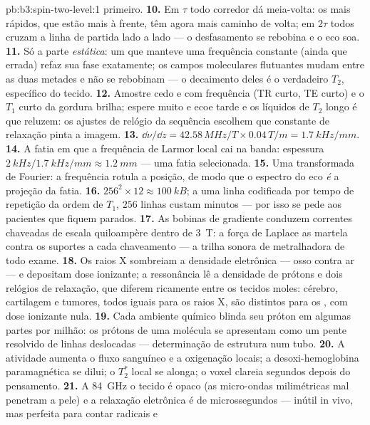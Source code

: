 \begin{solution}{pb:b3:spin-two-level:1}
primeiro.
\textbf{10.} Em $\tau$ todo corredor dá meia-volta: os mais rápidos,
que estão mais à frente, têm agora mais caminho de volta; em $2\tau$
todos cruzam a linha de partida lado a lado --- o desfasamento se
rebobina e o eco soa.
\textbf{11.} Só a parte \emph{estática}: um  que manteve uma
frequência constante (ainda que errada) refaz sua fase exatamente; os
campos moleculares flutuantes mudam entre as duas metades e não se
rebobinam --- o decaimento deles é o verdadeiro $T_2$, específico do
tecido.
\textbf{12.} Amostre cedo e com frequência (TR curto, TE curto) e o
$T_1$ curto da gordura brilha; espere muito e ecoe tarde e os líquidos
de $T_2$ longo é que reluzem: os ajustes de relógio da sequência
escolhem que constante de relaxação pinta a imagem.
\textbf{13.} $\dd\nu/\dd z = 42.58\,\unit{MHz/T} \times
0.04\,\unit{T/m} = \qty{1.7}{kHz/mm}$.
\textbf{14.} A fatia em que a frequência de Larmor local cai na banda:
espessura $\qty{2}{kHz}/\qty{1.7}{kHz/mm} \approx
\qty{1.2}{mm}$ --- uma fatia selecionada.
\textbf{15.} Uma transformada de Fourier: a frequência rotula a
posição, de modo que o espectro do eco \emph{é} a projeção da fatia.
\textbf{16.} $256^2 \times 12 \approx \qty{100}{kB}$; a uma linha
codificada por tempo de repetição da ordem de $T_1$, $256$ linhas
custam minutos --- por isso se pede aos pacientes que fiquem parados.
\textbf{17.} As bobinas de gradiente conduzem correntes chaveadas de
escala quiloampère dentro de \qty{3}{T}: a força de Laplace as martela
contra os suportes a cada chaveamento --- a trilha sonora de
metralhadora de todo exame.
\textbf{18.} Os raios X sombreiam a densidade eletrônica --- osso
contra ar --- e depositam dose ionizante; a ressonância lê a densidade
de prótons e dois relógios de relaxação, que diferem ricamente entre os
tecidos moles: cérebro, cartilagem e tumores, todos iguais para os
raios X, são distintos para os , com dose ionizante nula.
\textbf{19.} Cada ambiente químico blinda seu próton em algumas partes
por milhão: os prótons de uma molécula se apresentam como um pente
resolvido de linhas deslocadas --- determinação de estrutura num tubo.
\textbf{20.} A atividade aumenta o fluxo sanguíneo e a oxigenação
locais; a desoxi-hemoglobina paramagnética se dilui; o $T_2^*$ local se
alonga; o voxel clareia segundos depois do pensamento.
\textbf{21.} A \qty{84}{GHz} o tecido é opaco (as micro-ondas
milimétricas mal penetram a pele) e a relaxação eletrônica é de
microssegundos --- inútil in vivo, mas perfeita para contar radicais e

\end{solution}
